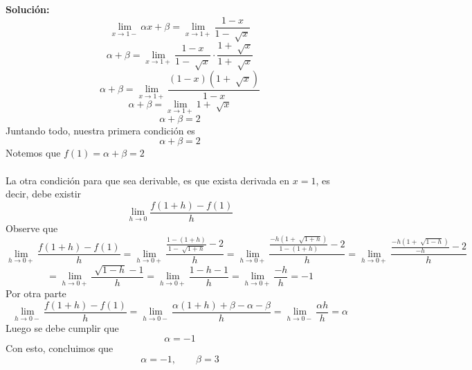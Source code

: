 \documentclass[12pt]{article}
\newenvironment{solucion}
{\begin{mdframed}[backgroundcolor=black!10]
		{\bf Solución:}\\
	}
	{
	\end{mdframed}
}
\newenvironment{preguntas}
{\begin{enumerate}\itemsep12pt
	}
	{
	\end{enumerate}
}
\newcommand{\ra}{\rightarrow}
\begin{document}
\begin{preguntas}
\begin{solucion}
$$\lim\limits_{x\ra 1-} \alpha x + \beta = \lim\limits_{x\ra 1+} \dfrac{1-x}{1-\sqrt[]{x}} $$
$$\alpha + \beta = \lim\limits_{x\ra 1+} \dfrac{1-x}{1-\sqrt[]{x}} \cdot \dfrac{1+\sqrt[]{x}}{1+\sqrt[]{x}} $$
$$\alpha + \beta = \lim\limits_{x\ra 1+} \dfrac{(1-x)(1+\sqrt[]{x})}{1-x}$$
$$\alpha + \beta = \lim\limits_{x\ra 1+} 1+\sqrt[]{x}$$
$$\alpha + \beta = 2$$
Juntando todo, nuestra primera condición es
$$\alpha + \beta = 2$$
Notemos que $f(1) = \alpha + \beta = 2$\\
\\
La otra condición para que sea derivable, es que exista derivada en $x=1$, es decir, debe existir
$$\lim\limits_{h\ra 0} \dfrac{f(1+h) - f(1)}{h}$$
Observe que
\small$$\lim\limits_{h\ra 0+} \dfrac{f(1+h) - f(1)}{h} = 
\lim\limits_{h\ra 0+} \dfrac{\frac{1-(1+h)}{1-\sqrt[]{1+h}}- 2}{h} = 
\lim\limits_{h\ra 0+} \dfrac{\frac{-h(1+\sqrt[]{1+h})}{1-(1+h)}- 2}{h} = 
\lim\limits_{h\ra 0+} \dfrac{\frac{-h(1+\sqrt[]{1-h})}{-h}- 2}{h}  $$
$$= 
\lim\limits_{h\ra 0+} \dfrac{\sqrt[]{1-h} - 1}{h} = 
\lim\limits_{h\ra 0+} \dfrac{1-h - 1}{h} = 
\lim\limits_{h\ra 0+} \dfrac{-h}{h} =
-1$$
Por otra parte
$$\lim\limits_{h\ra 0-} \dfrac{f(1+h) - f(1)}{h} = 
\lim\limits_{h\ra 0-} \dfrac{\alpha(1+h) +\beta - \alpha - \beta}{h} = 
\lim\limits_{h\ra 0-} \dfrac{\alpha h }{h} =
\alpha
$$
Luego se debe cumplir que
$$\alpha = -1$$
Con esto, concluimos que
$$\alpha = -1, \qquad \beta = 3$$
\end{solucion}
\end{preguntas}
\end{document}
